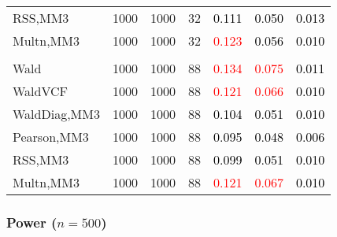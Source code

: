 \documentclass[
]{article}
\begin{document}
\begin{table}[H]
{\begin{tabular}[t]{lrrrrrr}
\hspace{1em}RSS,MM3 & 1000 & 1000 & 32 & \textcolor{black}{0.111} & \textcolor{black}{0.050} & \textcolor{black}{0.013}\\
\hspace{1em}Multn,MM3 & 1000 & 1000 & 32 & \textcolor{red}{0.123} & \textcolor{black}{0.056} & \textcolor{black}{0.010}\\
\addlinespace[0.3em]
\multicolumn{7}{l}{\textbf{3F 15V}}\\
\hspace{1em}Wald & 1000 & 1000 & 88 & \textcolor{red}{0.134} & \textcolor{red}{0.075} & \textcolor{black}{0.011}\\
\hspace{1em}WaldVCF & 1000 & 1000 & 88 & \textcolor{red}{0.121} & \textcolor{red}{0.066} & \textcolor{black}{0.010}\\
\hspace{1em}WaldDiag,MM3 & 1000 & 1000 & 88 & \textcolor{black}{0.104} & \textcolor{black}{0.051} & \textcolor{black}{0.010}\\
\hspace{1em}Pearson,MM3 & 1000 & 1000 & 88 & \textcolor{black}{0.095} & \textcolor{black}{0.048} & \textcolor{black}{0.006}\\
\hspace{1em}RSS,MM3 & 1000 & 1000 & 88 & \textcolor{black}{0.099} & \textcolor{black}{0.051} & \textcolor{black}{0.010}\\
\hspace{1em}Multn,MM3 & 1000 & 1000 & 88 & \textcolor{red}{0.121} & \textcolor{red}{0.067} & \textcolor{black}{0.010}\\
\bottomrule
\end{tabular}}
\endgroup{}
\end{table}

\hypertarget{power-n500-2}{%
\subsubsection{\texorpdfstring{Power
(\(n=500\))}{Power (n=500)}}\label{power-n500-2}}
\end{document}
